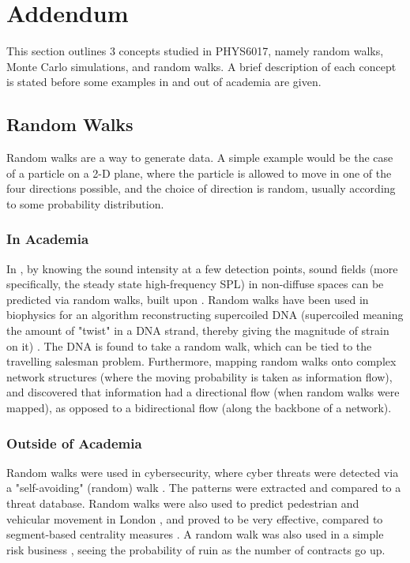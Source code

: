 \documentclass[10pt, twocolumn]{article}
\begin{document}
\section{Addendum} %
This section outlines 3 concepts studied in PHYS6017, namely random walks, Monte Carlo simulations, and random walks. A brief description of each concept is stated before some examples in and out of academia are given.
\subsection{Random Walks} %
Random walks are a way to generate data. A simple example would be the case of a particle on a 2-D plane, where the particle is allowed to move in one of the four directions possible, and the choice of direction is random, usually according to some probability distribution.

\subsubsection{In Academia} %
In \cite{Kruzins1982}, by knowing the sound intensity at a few detection points, sound fields (more specifically, the steady state high-frequency SPL) in non-diffuse spaces can be predicted via random walks, built upon \cite{Gerlach1975}. Random walks have been used in biophysics for an algorithm reconstructing supercoiled DNA \cite{Baba2020} (supercoiled meaning the amount of "twist" in a DNA strand, thereby giving the magnitude of strain on it) \cite{Bauer1980}. The DNA is found to take a random walk, which can be tied to the travelling salesman problem. Furthermore, mapping random walks onto complex network structures (where the moving probability is taken as information flow), and \cite{Noh2004} discovered that information had a directional flow (when random walks were mapped), as opposed to a bidirectional flow (along the backbone of a network). 

\subsubsection{Outside of Academia} %
Random walks were used in cybersecurity, where cyber threats were detected via a "self-avoiding" (random) walk \cite{Nia2016}. The patterns were extracted and compared to a threat database. Random walks were also used to predict pedestrian and vehicular movement in London \cite{Hanna2021}, and proved to be very effective, compared to segment-based centrality measures \cite{Jayasinghe2015}. A random walk was also used in a simple risk business \cite{Seal1966}, seeing the probability of ruin as the number of contracts go up.
\end{document}
